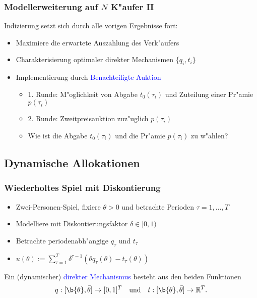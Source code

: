 \begin{frame}
\frametitle{Modellerweiterung auf $N$ K"aufer II}
\justifying
Indizierung setzt sich durch alle vorigen Ergebnisse fort:
\begin{itemize}
  \item Maximiere die erwartete Auszahlung des Verk"aufers
  \item Charakterisierung optimaler direkter Mechanismen $\{ q_{i}, t_{i}\}$
  \item Implementierung durch \textcolor{blue}{Benachteiligte Auktion}
  \begin{itemize}
    \item 1. Runde: M"oglichkeit von Abgabe $t_{0}(\tau_{i})$ und Zuteilung einer Pr"amie $p(\tau_{i})$
    \item 2. Runde: Zweitpreisauktion zuz"uglich $p(\tau_{i})$
    \item Wie ist die Abgabe $t_{0}(\tau_{i})$ und die Pr"amie $p(\tau_{i})$ zu w"ahlen?
  \end{itemize}
\end{itemize}
\end{frame}

\subsection{Dynamische Allokationen}
\begin{frame}
\frametitle{Wiederholtes Spiel mit Diskontierung}
\justifying
\begin{itemize}
  \item Zwei-Personen-Spiel, fixiere $\theta > 0$ und betrachte Perioden $\tau = 1,...,T$
  \item Modelliere mit Diskontierungsfaktor $\delta \in [0,1)$
  \item Betrachte periodenabh"angige $q_{\tau}$ und $t_{\tau}$
  \item $u(\theta) := \sum_{\tau=1}^{T} \delta^{\tau -1} (\theta q_\tau(\theta) - t_\tau(\theta))$
\end{itemize}

\begin{thmD}
  Ein (dynamischer) \textcolor{blue}{direkter Mechanismus} besteht aus den beiden Funktionen
  \begin{equation*}
    q:[ \b{\theta} , \bar{\theta} ] \rightarrow [0,1]^{T}
    \quad \text{und} \quad
    t:[ \b{\theta} , \bar{\theta} ] \rightarrow \mathbb{R}^{T}.
  \end{equation*}
\end{thmD}

\end{frame}

